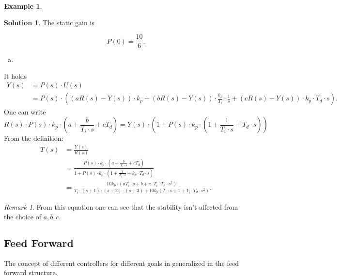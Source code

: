 \documentclass[a4paper,12 pt]{article}
\numberwithin{equation}{section}
\theoremstyle{definition}
\newtheorem{bsp}{Example}
\theoremstyle{remark}
\newtheorem*{bmk}{Remark}
\theoremstyle{definition}
\newtheorem*{lsg}{Solution}
\theoremstyle{definition}
\theoremstyle{definition}
\theoremstyle{remark}
\begin{document}
\begin{bsp}
\begin{lsg}
The static gain is

\begin{equation*}
P(0)=\frac{10}{6}.
\end{equation*}

\begin{enumerate}[(b)]
\item
\end{enumerate}

It holds
\begin{equation*}
\begin{split}
Y(s)&=P(s)\cdot U(s)\\
&=P(s)\cdot \left( (aR(s)-Y(s))\cdot k_p + (bR(s)-Y(s))\cdot \frac{k_p}{T_i}\cdot \frac{1}{s}+(cR(s)-Y(s))\cdot k_p\cdot T_d\cdot s \right).
\end{split}
\end{equation*}
One can write
\begin{equation*}
R(s)\cdot P(s) \cdot k_p \cdot \left( a+\frac{b}{T_i \cdot s}+cT_d \right)=Y(s)\cdot \left(1+P(s)\cdot k_p\cdot (1+\frac{1}{T_i\cdot s}+T_d \cdot s)\right)
\end{equation*}
From the definition:
\begin{equation*}
\begin{split}
T(s)&=\frac{Y(s)}{R(s)}\\
&= \frac{P(s) \cdot k_p \cdot \left( a+\frac{b}{T_i \cdot s}+cT_d \right)}{1+P(s)\cdot k_p\cdot (1+\frac{1}{T_i \cdot s}+k_p\cdot T_d \cdot s)}\\
&= \frac{10k_p\cdot (aT_i\cdot s + b + c\cdot T_i \cdot T_d \cdot s^2)}{T_i\cdot (s+1)\cdot (s+2)\cdot (s+3) + 10k_p(T_i\cdot s+1+T_i\cdot T_d \cdot s^2)}.
\end{split}

\end{equation*}

\begin{bmk}
From this equation one can see that the stability isn't affected from the choice of $a,b,c$.
\end{bmk}



\end{lsg}


\end{bsp}
\newpage
\subsection{Feed Forward}
The concept of different controllers for different goals in generalized in the feed forward structure.
\end{document}
